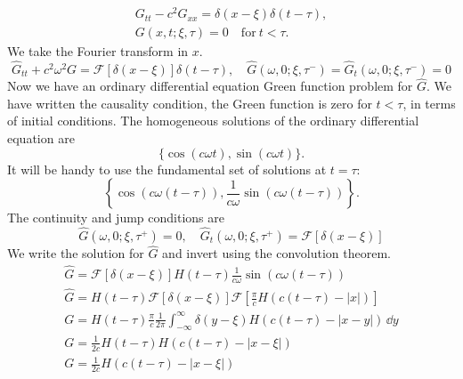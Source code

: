 {%
\begin{Solution}
  \begin{gather*}
    G_{t t} - c^2 G_{x x} = \delta(x - \xi) \delta(t - \tau), 
    \\
    G(x,t;\xi,\tau) = 0 \quad \mathrm{for}\ t < \tau.
  \end{gather*}
  We take the Fourier transform in $x$.
  \[
  \hat{G}_{t t} + c^2 \omega^2 G = \mathcal{F}[\delta(x - \xi)] \delta(t - \tau), \quad
  \hat{G}(\omega,0;\xi,\tau^-) = \hat{G}_t(\omega,0;\xi,\tau^-) = 0
  \]
  Now we have an ordinary differential equation Green function problem for 
  $\hat{G}$.  We have written the causality condition, the Green 
  function is zero for $t < \tau$, in terms of initial conditions.  
  The homogeneous solutions of the ordinary differential equation are
  \[
  \{ \cos(c \omega t), \sin(c \omega t) \}.
  \]
  It will be handy to use the fundamental set of solutions at $t = \tau$:
  \[
  \left\{ \cos(c \omega (t - \tau)), \frac{1}{c \omega} \sin(c \omega (t - \tau)) \right\}.
  \]
  The continuity and jump conditions are 
  \[
  \hat{G}(\omega,0;\xi,\tau^+) = 0, \quad \hat{G}_t(\omega,0;\xi,\tau^+) = \mathcal{F}[\delta(x - \xi)] 
  \]
  We write the solution for $\hat{G}$ and invert using the convolution theorem.
  \begin{gather*}
    \hat{G} = \mathcal{F}[\delta(x-\xi)] H(t-\tau) \frac{1}{c \omega} \sin( c \omega (t - \tau)) 
    \\
    \hat{G} = H(t-\tau) \mathcal{F}[\delta(x-\xi)] 
    \mathcal{F} \left[ \frac{\pi}{c} H(c (t-\tau) - |x|) \right] 
    \\
    G = H(t-\tau) \frac{\pi}{c} \frac{1}{2\pi} \int_{-\infty}^\infty
    \delta(y - \xi) H(c (t-\tau) - |x - y| ) \,\dd y 
    \\
    G = \frac{1}{2c} H(t-\tau) H(c (t-\tau) - |x - \xi| ) 
    \\
    \boxed{
      G = \frac{1}{2c} H(c (t-\tau) - |x - \xi| )
      }
  \end{gather*}


\end{Solution}}
